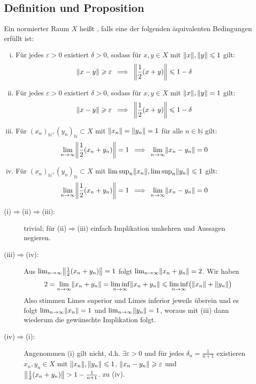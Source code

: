 \subsection[Definition und Proposition: Gleichmäßig konvexer Raum]{Definition und Proposition} %
\label{sub:61}
Ein normierter Raum $X$ heißt , falls eine der folgenden äquivalenten Bedingungen erfüllt ist:
\begin{enumerate}[(i)]
	\item Für jedes $\varepsilon>0$ existiert $\delta >0$, sodass für $x,y \in X$ mit $\norm{x}, \norm{y} \le 1$ gilt:
	\[
		\norm{x-y} \ge \varepsilon \enspace\Longrightarrow \enspace\norm{\frac{1}{2} (x+y) } \le 1 -\delta 
	\]
	\item \label{61:enum:2} Für jedes $\varepsilon>0$ existiert $\delta >0$, sodass für $x,y \in X$ mit $\norm{x}, \norm{y}= 1$ gilt:
	\[
		\norm{x-y} \ge \varepsilon \enspace\Longrightarrow \enspace\norm{\frac{1}{2} (x+y)} \le 1-\delta   
	\]
	\item Für $(x_n)_\mathds{N}, (y_n)_\mathds{N} \subset X$ mit $\norm{x_n} = \norm{y_n}=1$ für alle $n \in \mathds{N}$ gilt: 
	\[
		\lim_{ n \to \infty} \norm{\frac{1}{2} (x_n+y_n)}=1 \enspace\Longrightarrow \enspace\lim_{ n \to \infty} \norm{x_n- y_n}=0  
	\]
	\item \label{61:enum:4}Für $(x_n)_\mathds{N}, (y_n)_\mathds{N} \subset X$ mit $\limsup_n \norm{x_n}, \limsup_n \norm{y_n}\le 1$ gilt:
	\[
		\lim_{ n \to \infty} \norm{\frac{1}{2} (x_n+y_n)}=1 \enspace\Longrightarrow \enspace\lim_{ n \to \infty} \norm{x_n- y_n}=0  
	\]
\end{enumerate}
\begin{description}
	\item[(i)$\Rightarrow$(ii)$\Rightarrow$(iii):] trivial; für (ii)$\Rightarrow$(iii) einfach Implikation umkehren und Aussagen negieren. 
	\item[(iii)$\Rightarrow$(iv):] Aus $\lim_{ n \to \infty} \norm{\frac{1}{2} (x_n+y_n)}=1$ folgt $\lim_{n \to \infty} \norm{x_n +y_n}=2$. Wir haben
	\[
		2 = \lim_{n \to \infty} \norm{x_n +y_n} = \liminf_{n \to \infty} \norm{x_n +y_n} \le \liminf_{n \to \infty} \enbrace[\big]{\norm{x_n} + \norm{y_n}}    
	\]
	Also stimmen Limes superior und Limes inferior jeweils überein und es folgt $\lim_{ n \to \infty} \norm{x_n}=1$ und $ \lim_{ n \to \infty} \norm{y_n}=1$, woraus mit (iii)
	dann wiederum die gewünschte Implikation folgt.
	\item[(iv)$\Rightarrow$(i):] Angenommen (i) gilt nicht, d.h. $\exists \varepsilon>0$ und für jedes $\delta_n=\frac{1}{n+1}$ existieren $x_n,y_n \in X$ mit 
	$\norm{x_n}, \norm{y_n}\le 1$, $\norm{x_n-y_n}\ge \varepsilon$ und $\norm{\frac{1}{2}(x_n+y_n)} > 1- \frac{1}{n+1}$. \light zu (iv). \bewende
\end{description}

